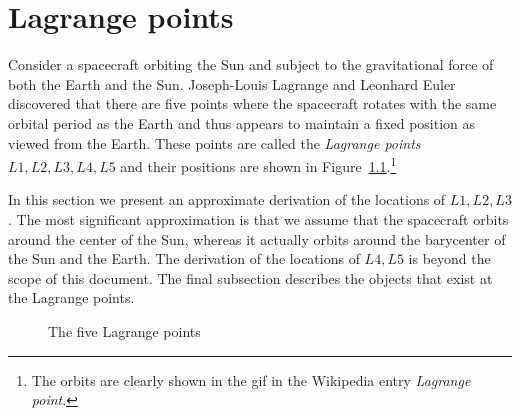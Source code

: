 
\chapter{Lagrange points}\label{s.lagrange}

Consider a spacecraft orbiting the Sun and subject to the gravitational force of both the Earth and the Sun. Joseph-Louis Lagrange and Leonhard Euler discovered that there are five points where the spacecraft rotates with the same orbital period as the Earth and thus appears to maintain a fixed position as viewed from the Earth. These points are called the \emph{Lagrange points} $L1, L2, L3, L4, L5$ and their positions are shown in Figure~\ref{f.lagrangepoints}.\footnote{The orbits are clearly shown in the gif in the Wikipedia entry \emph{Lagrange point}.}

In this section we present an approximate derivation of the locations of $L1, L2, L3$. The most significant approximation is that we assume that the spacecraft orbits around the center of the Sun, whereas it actually orbits around the barycenter of the Sun and the Earth. The derivation of the locations of $L4, L5$ is beyond the scope of this document. The final subsection describes the objects that exist at the Lagrange points.

\begin{figure}[b]
\begin{center}
\end{center}
\caption{The five Lagrange points}\label{f.lagrangepoints}
\end{figure}

